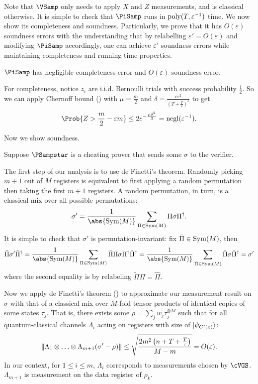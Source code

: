 Note that $\VSamp$ only needs to apply $X$ and $Z$ measurements, and is classical otherwise.
It is simple to check that $\PiSamp$ runs in $\operatorname*{\operatorname{poly}}(T, \varepsilon^{-1})$ time.
We now show its completeness and soundness.
Particularly, we prove that it has $O(\varepsilon)$ soundness errors
with the understanding that by relabelling $\varepsilon'=O(\varepsilon)$ and modifying $\PiSamp$ accordingly,
one can achieve $\varepsilon'$ soundness errors while maintaining completeness and running time properties.
  
\begin{thm}
    \label{QPIP1thm}
	$\PiSamp$ has negligible completeness error and $O(\varepsilon)$ soundness error.
\end{thm}
\begin{prf}
	For completeness, notice $z_i$ are i.i.d. Bernoulli trials with success probability $\frac{1}{2}$.
	So we can apply Chernoff bound () with $\mu=\frac{m}{2}$ and $\delta=\frac{c\varepsilon^2}{\left(T+\frac{T}{\varepsilon}\right)^5}$ to get
	$$\Prob{Z>\frac{m}{2}-\varepsilon m}\leq2e^{-\frac{\mu\delta^2}{3}}=\negl(\varepsilon^{-1}).$$
	

	Now we show soundness.

	Suppose $\PSampstar$ is a cheating prover that sends some $\sigma$ to the verifier.

	The first step of our analysis is to use de Finetti's theorem.
	Randomly picking $m+1$ out of $M$ registers is equivalent to first applying a random permutation then taking the first $m+1$ registers.
	A random permutation, in turn, is a classical mix over all possible permutations:
	$$\sigma'=\frac{1}{\abs{\Sym(M)}}\sum_{\Pi\in\Sym(M)}\Pi\sigma\Pi^\dagger.$$
	It is simple to check that $\sigma'$ is permutation-invariant:
	fix $\tilde{\Pi}\in\operatorname{Sym}(M)$, then
	$$\tilde{\Pi}\sigma'\tilde{\Pi}^\dagger
	=\frac{1}{\abs{\Sym(M)}}\sum_{\Pi\in\Sym(M)}\tilde{\Pi}\Pi\sigma\Pi^\dagger\tilde{\Pi}^\dagger
	=\frac{1}{\abs{\Sym(M)}}\sum_{\hat{\Pi}\in\Sym(M)}\hat{\Pi}\sigma\hat{\Pi}^\dagger
	=\sigma'$$
	where the second equality is by relabeling $\tilde{\Pi}\Pi=\hat{\Pi}$.


	Now we apply de Finetti's theorem () to approximate our measurement result on $\sigma$ with that of a classical mix over $M$-fold tensor products of identical copies of some states $\tau_j$.
	That is, there exists some $\rho=\sum_j w_j\tau_j^{\otimes M}$
	such that for all quantum-classical channels $\Lambda_i$ acting on registers with size of $\ket{\psi_{C'(x)}}$:
	$$\left\lVert\Lambda_1\otimes\ldots\otimes\Lambda_{m+1}(\sigma'-\rho)\right\rVert
	\leq\sqrt{\frac{2m^2\left(n+T+\frac{T}{\varepsilon}\right)}{M-m}}
	=O(\varepsilon).$$
	In our context, for $1\leq i\leq m$, $\Lambda_i$ corresponds to measurements chosen by $\cVGS$.
	$\Lambda_{m+1}$ is measurement on the data register of $\rho_k$.
	

\end{prf}
